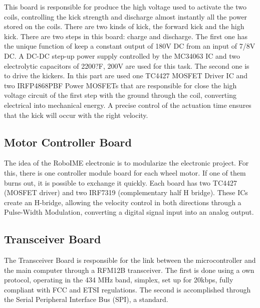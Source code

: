 This board is responsible for produce the high voltage used to activate the two
coils, controlling the kick strength and discharge almost instantly all the
power stored on the coils. There are two kinds of kick, the forward kick and
the high kick. There are two steps in this board: charge and discharge. The
first one has the unique function of keep a constant output of 180V DC from an
input of 7/8V DC. A DC-DC step-up power supply controlled by the MC34063 IC and
two electrolytic capacitors of 2200?F, 200V are used for this task. The second
one is to drive the kickers. In this part are used one TC4427 MOSFET Driver IC
and two IRFP4868PBF Power MOSFETs that are responsible for close the high
voltage circuit of the first step with the ground through the coil, converting
electrical into mechanical energy. A precise control of the actuation time
ensures that the kick will occur with the right velocity.



\subsection{Motor Controller Board}

The idea of the RoboIME electronic is to modularize the electronic project. For
this, there is one controller module board for each wheel motor. If one of them
burns out, it is possible to exchange it quickly. Each board has two TC4427
(MOSFET driver) and two IRF7319 (complementary half H bridge). These ICs create
an H-bridge, allowing the velocity control in both directions through a
Pulse-Width Modulation, converting a digital signal input into an analog
output.


\subsection{Transceiver Board}

The Transceiver Board is responsible for the link between the microcontroller
and the main computer through a RFM12B transceiver. The first is done using a
own protocol, operating in the 434 MHz band, simplex, set up for 20kbps, fully
compliant with FCC and ETSI regulations. The second is accomplished through the
Serial Peripheral Interface Bus (SPI), a standard.

